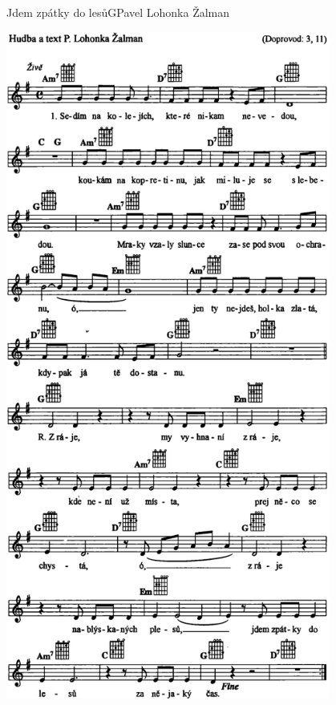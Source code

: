 \setcounter{page}{39}
\begin{song}{Jdem zpátky do lesů}{G}{Pavel Lohonka Žalman}
\begin{center}
\includegraphics[width=0.8\textwidth]{noty/a_jdem-zpátky-do-lesů} 
\end{center}
\end{song} \pagebreak
